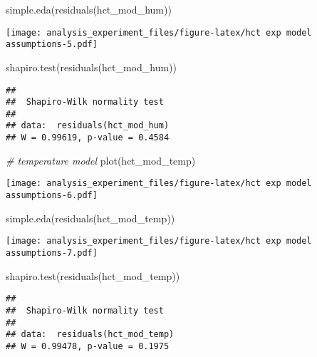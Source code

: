 \documentclass[
]{article}
\newenvironment{Shaded}{\begin{snugshade}}{\end{snugshade}}
\newcommand{\CommentTok}[1]{\textcolor[rgb]{0.56,0.35,0.01}{\textit{#1}}}
\newcommand{\FunctionTok}[1]{\textcolor[rgb]{0.00,0.00,0.00}{#1}}
\newcommand{\NormalTok}[1]{#1}
\begin{document}
\begin{Shaded}
\begin{Highlighting}[]
\FunctionTok{simple.eda}\NormalTok{(}\FunctionTok{residuals}\NormalTok{(hct\_mod\_hum))}
\end{Highlighting}
\end{Shaded}

\texttt{[image: analysis\_experiment\_files/figure-latex/hct exp model assumptions-5.pdf]}

\begin{Shaded}
\begin{Highlighting}[]
\FunctionTok{shapiro.test}\NormalTok{(}\FunctionTok{residuals}\NormalTok{(hct\_mod\_hum))}
\end{Highlighting}
\end{Shaded}

\begin{verbatim}
## 
##  Shapiro-Wilk normality test
## 
## data:  residuals(hct_mod_hum)
## W = 0.99619, p-value = 0.4584
\end{verbatim}

\begin{Shaded}
\begin{Highlighting}[]
\CommentTok{\# temperature model}
\FunctionTok{plot}\NormalTok{(hct\_mod\_temp)}
\end{Highlighting}
\end{Shaded}

\texttt{[image: analysis\_experiment\_files/figure-latex/hct exp model assumptions-6.pdf]}

\begin{Shaded}
\begin{Highlighting}[]
\FunctionTok{simple.eda}\NormalTok{(}\FunctionTok{residuals}\NormalTok{(hct\_mod\_temp))}
\end{Highlighting}
\end{Shaded}

\texttt{[image: analysis\_experiment\_files/figure-latex/hct exp model assumptions-7.pdf]}

\begin{Shaded}
\begin{Highlighting}[]
\FunctionTok{shapiro.test}\NormalTok{(}\FunctionTok{residuals}\NormalTok{(hct\_mod\_temp))}
\end{Highlighting}
\end{Shaded}

\begin{verbatim}
## 
##  Shapiro-Wilk normality test
## 
## data:  residuals(hct_mod_temp)
## W = 0.99478, p-value = 0.1975
\end{verbatim}
\end{document}
